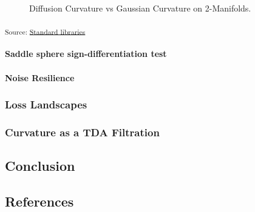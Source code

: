 \documentclass[
]{agujournal2019}
\let\oldparagraph\paragraph
\renewcommand{\paragraph}[1]{\oldparagraph{#1}\mbox{}}
\newlength{\cslhangindent}
\newenvironment{CSLReferences}[2] %
 {\begin{list}{}{%
  \setlength{\itemindent}{0pt}
  \setlength{\leftmargin}{0pt}
  \setlength{\parsep}{0pt}
  \ifodd #1
   \setlength{\leftmargin}{\cslhangindent}
   \setlength{\itemindent}{-1\cslhangindent}
  \fi
  \setlength{\itemsep}{#2\baselineskip}}}
 {\end{list}}
\begin{document}
\begin{figure}[H]


\caption{\label{fig-2-manifolds}Diffusion Curvature vs Gaussian
Curvature on 2-Manifolds.}

\end{figure}%

\textsubscript{Source:
\href{https://professorwug.github.io/diffusion-curvature//home/piriac/Pumberton/Workshop/21-SUMRY-Curvature/diffusion-curvature/nbs/experiments/2a-Toy-Manifolds.ipynb.html\#cell-fig-2-manifolds}{Standard
libraries}}

\paragraph{Saddle sphere sign-differentiation
test}\label{saddle-sphere-sign-differentiation-test}

\paragraph{Noise Resilience}\label{noise-resilience}

\subsubsection{Loss Landscapes}\label{loss-landscapes}

\subsubsection{Curvature as a TDA
Filtration}\label{curvature-as-a-tda-filtration}

\subsection{Conclusion}\label{conclusion}

\subsection*{References}\label{references}

\label{refs}
\begin{CSLReferences}{0}{1}
\vspace{1em}

\end{CSLReferences}
\end{document}
